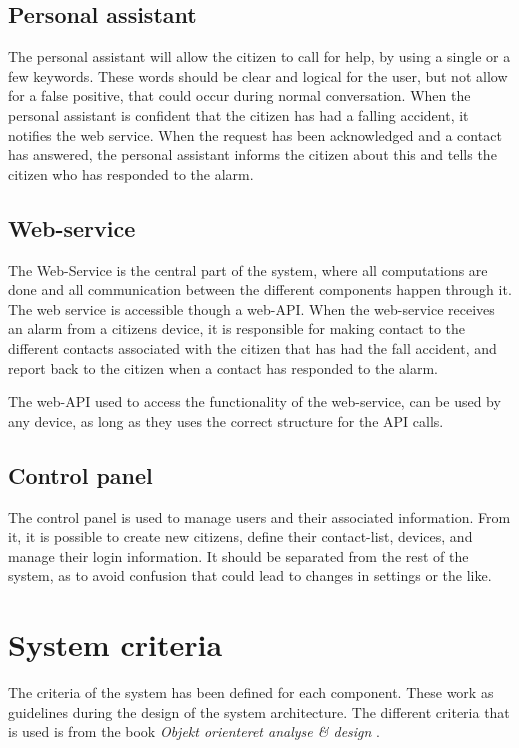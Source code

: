 \subsection{Personal assistant}
The personal assistant will allow the citizen to call for help, by using a single or a few keywords. These words should be clear and logical for the user, but not allow for a false positive, that could occur during normal conversation. When the personal assistant is confident that the citizen has had a falling accident, it notifies the web service. When the request has been acknowledged and a contact has answered, the personal assistant informs the citizen about this and tells the citizen who has responded to the alarm.

\subsection{Web-service}
The Web-Service is the central part of the system, where all computations are done and all communication between the different components happen through it. The web service is accessible though a web-API. When the web-service receives an alarm from a citizens device, it is responsible for making contact to the different contacts associated with the citizen that has had the fall accident, and report back to the citizen when a contact has responded to the alarm.

The web-API used to access the functionality of the web-service, can be used by any device, as long as they uses the correct structure for the API calls.

\subsection{Control panel}
The control panel is used to manage users and their associated information. From it, it is possible to create new citizens, define their contact-list, devices, and manage their login information. It should be separated from the rest of the system, as to avoid confusion that could lead to changes in settings or the like.

\section{System criteria}
\label{sec:non-requirements}
The criteria of the system has been defined for each component. These work as guidelines during the design of the system architecture. The different criteria that is used is from the book \textit{Objekt orienteret analyse \& design} \cite{subook}.

